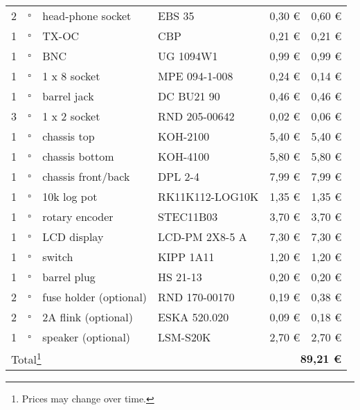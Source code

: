 \begin{longtable}{|p{}|p{}|p{}|p{}|p{}|p{}|}
2 & $\square$ & head-phone socket & EBS 35 & 0,30 \euro & 0,60 \euro\\
1 & $\square$ & TX-OC & CBP & 0,21 \euro & 0,21 \euro \\
1 & $\square$ & BNC & UG 1094W1 & 0,99 \euro & 0,99 \euro \\
1 & $\square$ & 1 x 8 socket & MPE 094-1-008 & 0,24 \euro & 0,14 \euro \\
1 & $\square$ & barrel jack & DC BU21 90 & 0,46 \euro & 0,46 \euro \\
3 & $\square$ & 1 x 2 socket & RND 205-00642 & 0,02 \euro & 0,06 \euro \\ \hline
1 & $\square$ & chassis top & KOH-2100 & 5,40 \euro & 5,40 \euro \\
1 & $\square$ & chassis bottom & KOH-4100 & 5,80 \euro & 5,80 \euro \\
1 & $\square$ & chassis front/back & DPL 2-4 & 7,99 \euro & 7,99 \euro \\
1 & $\square$ & 10k log pot & RK11K112-LOG10K & 1,35 \euro & 1,35 \euro \\
1 & $\square$ & rotary encoder & STEC11B03 & 3,70 \euro & 3,70 \euro \\
1 & $\square$ & LCD display & LCD-PM 2X8-5 A & 7,30 \euro & 7,30 \euro \\
1 & $\square$ & switch & KIPP 1A11 & 1,20 \euro & 1,20 \euro \\
1 & $\square$ & barrel plug & HS 21-13 & 0,20 \euro & 0,20 \euro \\
2 & $\square$ & fuse holder (optional) & RND 170-00170 & 0,19 \euro & 0,38 \euro \\
2 & $\square$ & 2A flink (optional) & ESKA 520.020 & 0,09 \euro & 0,18 \euro \\
1 & $\square$ & speaker (optional) & LSM-S20K & 2,70 \euro & 2,70 \euro \\ \hline \hline
\multicolumn{4}{|l}{Total\footnote{Prices may change over time.}} & \multicolumn{2}{r|}{\textbf{89,21 \euro}} \\ \hline
\end{longtable}

